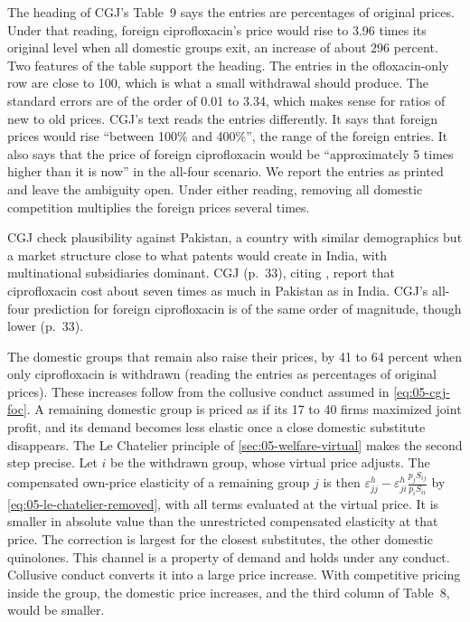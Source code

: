 \begin{remark}\label{rem:05-cgj-table9}
The heading of CGJ's Table~9 says the entries are percentages of original prices. Under that reading, foreign
ciprofloxacin's price would rise to 3.96 times its original level when all domestic groups exit, an increase of
about 296 percent. Two features of the table support the heading. The entries in the ofloxacin-only row are close to
100, which is what a small withdrawal should produce. The standard errors are of the order of 0.01 to 3.34, which
makes sense for ratios of new to old prices. CGJ's text reads the entries differently. It says that foreign prices
would rise ``between 100\% and 400\%'', the range of the foreign entries. It also says that the price of foreign
ciprofloxacin would be ``approximately 5 times higher than it is now'' in the all-four scenario. We report the
entries as printed and leave the ambiguity open. Under either reading, removing all domestic competition multiplies
the foreign prices several times.
\end{remark}

CGJ check plausibility against Pakistan, a country with similar demographics but a market structure close to what
patents would create in India, with multinational subsidiaries dominant. CGJ (p.~33), citing
\citet[p.~39, Table~2]{Lanjouw1998}, report that ciprofloxacin cost about seven times as much in Pakistan as in
India. CGJ's all-four prediction for foreign ciprofloxacin is of the same order of magnitude, though lower (p.~33).

The domestic groups that remain also raise their prices, by 41 to 64 percent when only ciprofloxacin is withdrawn
(reading the entries as percentages of original prices). These increases follow from the collusive conduct assumed
in \eqref{eq:05-cgj-foc}. A remaining domestic group is priced as if its 17 to 40 firms maximized joint profit, and
its demand becomes less elastic once a close domestic substitute disappears. The Le Chatelier principle of
\cref{sec:05-welfare-virtual} makes the second step precise. Let $i$ be the withdrawn group, whose virtual price
adjusts. The compensated own-price elasticity of a remaining group $j$ is then $\varepsilon^h_{jj} -
\varepsilon^h_{ji}\frac{p_jS_{ij}}{p_iS_{ii}}$ by \eqref{eq:05-le-chatelier-removed}, with all terms evaluated at the
virtual price. It is smaller in absolute value than the unrestricted compensated elasticity at that price. The
correction is largest for the closest substitutes, the other domestic quinolones. This channel is a
property of demand and holds under any conduct. Collusive conduct converts it into a large price increase. With
competitive pricing inside the group, the domestic price increases, and the third column of Table~8, would be smaller.

